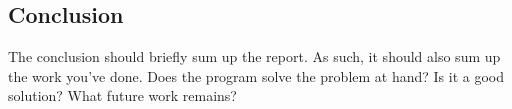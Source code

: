 \subsection{Conclusion}

\label{sec:conclusion}

The conclusion should briefly sum up the report. As such, it should also sum up
the work you've done. Does the program solve the problem at hand? Is it a good
solution? What future work remains?

